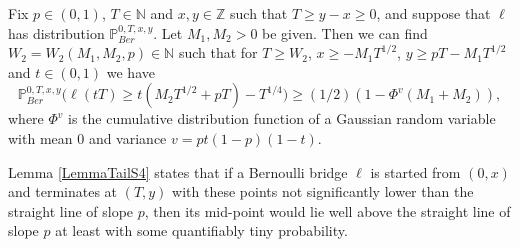 \begin{lemma}\label{LemmaTailS4}Fix $p \in (0,1)$, $T \in \mathbb{N}$ and $x, y\in \mathbb{Z}$ such that $T \geq y-x \geq 0$, and suppose that $\ell$ has distribution $\mathbb{P}^{0,T,x,y}_{Ber}$. Let $M_1,M_2 > 0$ be given. Then we can find $W_2 = W_2(M_1,M_2,p) \in \mathbb{N}$ such that for $T \geq W_2$, $ x \geq -M_1T^{1/2}$, $ y \geq pT -  M_1T^{1/2}$ and $t\in(0,1)$ we have
\begin{equation}\label{halfEq2S4}
\mathbb{P}^{0,T,x,y}_{Ber}\bigg( \ell(tT)  \geq t(M_2T^{1/2} + pT) - T^{1/4} \bigg) \geq (1/2) (1 - \Phi^{v}(M_1 + M_2) ),
\end{equation}
where $\Phi^{v}$ is the cumulative distribution function  of a Gaussian random variable with mean $0$ and variance $v = pt(1-p)(1-t)$.
\end{lemma}
\begin{remark} Lemma \ref{LemmaTailS4} states that  if a Bernoulli bridge $\ell$ is started from $(0,x)$ and terminates at $(T,y)$ with these points not significantly lower than the straight line of slope $p$, then its mid-point would lie well above the straight line of slope $p$ at least with some quantifiably tiny probability.
\end{remark}
